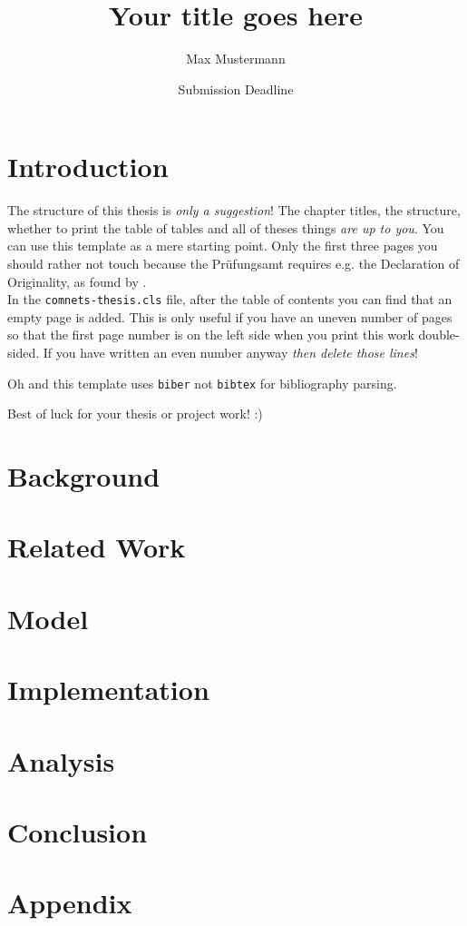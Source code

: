 \documentclass{comnets-thesis}
\title{Your title goes here}
\author{Max Mustermann}
\date{Submission Deadline}
\begin{document}
\maketitlepage

\chapter{Introduction}\label{chp:introduction}
The structure of this thesis is \emph{only a suggestion}! The chapter titles, the structure, whether to print the table of tables and all of theses things \emph{are up to you}. You can use this template as a mere starting point. Only the first three pages you should rather not touch because the Prüfungsamt requires e.g. the Declaration of Originality, as found by \cite{SuperSmartGuy}.\\
In the \texttt{comnets-thesis.cls} file, after the table of contents you can find that an empty page is added. This is only useful if you have an uneven number of pages so that the first page number is on the left side when you print this work double-sided. If you have written an even number anyway \emph{then delete those lines}!

Oh and this template uses \texttt{biber} not \texttt{bibtex} for bibliography parsing.

Best of luck for your thesis or project work! :)

\chapter{Background}\label{chp:background}
\chapter{Related Work}\label{chp:related}
\chapter{Model}\label{chp:model}
\chapter{Implementation}\label{chp:implementation}
\chapter{Analysis}\label{chp:analysis}
\chapter{Conclusion}\label{chp:conclusion}
\appendix
\chapter{Appendix}\label{chp:appendix}
\listoffigures
\listoftables
\printbibliography[heading=bibintoc]
\end{document}
